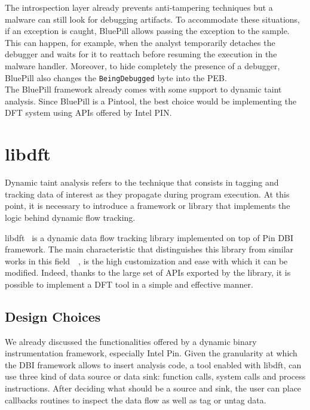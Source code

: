 \documentclass[LaM,binding=0.6cm]{sapthesis}
\begin{document}
The introspection layer already prevents anti-tampering techniques but a malware can still look for debugging artifacts. To accommodate these situations, if an exception is caught, BluePill allows passing the exception to the sample. This can happen, for example, when the analyst temporarily detaches the debugger and waits for it to reattach before resuming the execution in the malware handler. Moreover, to hide completely the presence of a debugger, BluePill also changes the \texttt{BeingDebugged} byte into the PEB.\\

The BluePill framework already comes with some support to dynamic taint analysis. Since BluePill is a Pintool, the best choice would be implementing the DFT system using APIs offered by Intel PIN.

\section{libdft}
\label{sec:libdft}
Dynamic taint analysis refers to the technique that consists in tagging and tracking data of interest as they propagate during program execution. At this point, it is necessary to introduce a framework or library that implements the logic behind dynamic flow tracking.

libdft~\cite{kemerlis2012libdft} is a dynamic data flow tracking library implemented on top of Pin DBI framework. The main characteristic that distinguishes this library from similar works in this field~\cite{bosman2011minemu}~\cite{qin2006lift}, is the high customization and ease with which it can be modified. Indeed, thanks to the large set of APIs exported by the library, it is possible to implement a DFT tool in a simple and effective manner.

\subsection{Design Choices}
We already discussed the functionalities offered by a dynamic binary instrumentation framework, especially Intel Pin. Given the granularity at which the DBI framework allows to insert analysis code, a tool enabled with libdft, can use three kind of data source or data sink: function calls, system calls and process instructions. After deciding what should be a source and sink, the user can place callbacks routines to inspect the data flow as well as tag or untag data.
\end{document}
